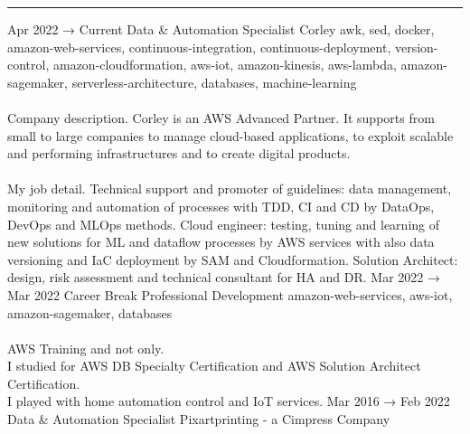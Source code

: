 \documentclass[9pt]{stackoverflow} %
\begin{document}

\textcolor{stackoverflow}{\hrule}
\vspace{4pt} %
\begin{tcolorbox}[blanker,width=0.75\textwidth,enlarge left by=0.25\textwidth,before skip=6pt,breakable,
	overlay unbroken and first={%
	  \node[inner sep=0pt,outer sep=0pt,text width=0.35\textwidth,
		align=none,
		below right]
		at ([xshift=-0.25\textwidth]frame.north west)
{
	\cvsect{Experience}
};}]
{\vspace{-16.3pt} %
	\small\begin{entrylist}
	\entry
		{Apr 2022 → Current}
		{Data \& Automation Specialist}
		{Corley}
		{{awk, sed, docker, amazon-web-services, continuous-integration, continuous-deployment, version-control, amazon-cloudformation, aws-iot, amazon-kinesis, aws-lambda, amazon-sagemaker, serverless-architecture, databases, machine-learning}\\\\
		Company description. Corley is an AWS Advanced Partner. It supports from small to large companies to manage cloud-based applications,
		to exploit scalable and performing infrastructures and to create digital products.\\\\
		My job detail. Technical support and promoter of guidelines: data management, monitoring and automation of processes with TDD, CI and CD by DataOps, DevOps and MLOps methods.
		Cloud engineer: testing, tuning and learning of new solutions for ML and dataflow processes by AWS services with also data versioning and IaC deployment by SAM and Cloudformation.
		Solution Architect: design, risk assessment and technical consultant for HA and DR.}
	\entry
		{Mar 2022 → Mar 2022}
		{Career Break}
		{Professional Development}
		{{amazon-web-services, aws-iot, amazon-sagemaker, databases}\\\\
		AWS Training and not only.\\
		I studied for AWS DB Specialty Certification and AWS Solution Architect Certification.\\
		I played with home automation control and IoT services.}
	\entry
		{Mar 2016 → Feb 2022}
		{Data \& Automation Specialist}
		{Pixartprinting - a Cimpress Company}

\end{entrylist}}
\end{tcolorbox}
\end{document}
